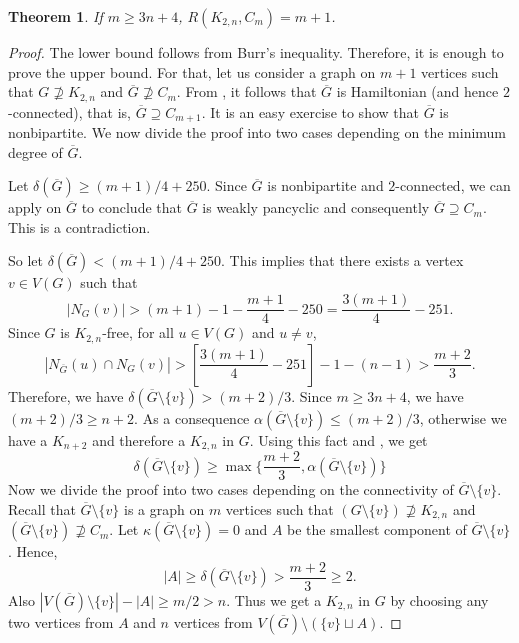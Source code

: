 \documentclass[12pt]{article}
\newtheorem{theorem}{Theorem}
\theoremstyle{definition}
\begin{document}
\begin{theorem}
    If $m\geq 3n+4$, $R(K_{2,n},C_{m})=m+1$.
\end{theorem}
\begin{proof}
    The lower bound follows from Burr's inequality. Therefore, it is enough to prove the upper bound. For that, let us consider a graph on $m+1$ vertices such that $ G\nsupseteq K_{2,n}$ and $ \overline{G}\nsupseteq C_{m}$. From , it follows that $\overline{G}$ is Hamiltonian (and hence $2$-connected), that is, $\overline{G}\supseteq C_{m+1}$. It is an easy exercise to show that $\overline{G}$ is nonbipartite. We now divide the proof into two cases depending on the minimum degree of $\overline{G}$.

    Let $\delta(\overline{G})\geq (m+1)/4+250$. Since $\overline{G}$ is nonbipartite and $2$-connected, we can apply  on $\overline{G}$ to conclude that $\overline{G}$ is weakly pancyclic and consequently $ \overline{G}\supseteq C_{m} $. This is a contradiction.

    So let $\delta(\overline{G})< (m+1)/4+250$. This implies that there exists a vertex $v\in V(G)$ such that
    \begin{equation*}
        |N_G(v)|>(m+1)-1-\frac{m+1}{4}-250=\frac{3(m+1)}{4}-251.
    \end{equation*}
    Since $G$ is $K_{2,n}$-free, for all $u\in V(G)$ and $u\neq v$,
    \begin{equation*}\label{eqn:min degree of G-v}
        |N_{\overline{G}}(u)\cap N_G(v)|>\left[\frac{3(m+1)}{4}-251\right]-1-(n-1)>\frac{m+2}{3}.
    \end{equation*}
    Therefore, we have $\delta(\overline{G}\setminus \{v\})> (m+2)/3$. Since $m\geq 3n+4$, we have $(m+2)/3\geq n+2$. As a consequence $\alpha(\overline{G}\setminus \{v\})\leq (m+2)/3$, otherwise we have a $K_{n+2}$ and therefore a $K_{2,n}$ in $G$. Using this fact and , we get
    \begin{equation*}
        \delta(\overline{G}\setminus \{v\})\geq \max \bigg\{\frac{m+2}{3},\alpha(\overline{G}\setminus \{v\})\bigg\}
    \end{equation*}
    Now we divide the proof into two cases depending on the connectivity of $\overline{G}\setminus \{v\}$. Recall that $\overline{G}\setminus \{v\}$ is a graph on $m$ vertices such that $(G\setminus \{v\})\nsupseteq K_{2,n}$ and $(\overline{G}\setminus \{v\})\nsupseteq C_{m}$. Let $\kappa(\overline{G}\setminus \{v\})=0$ and $A$ be the smallest component of $\overline{G}\setminus \{v\}$. Hence,
    \begin{equation*}
        |A|\geq \delta(\overline{G}\setminus \{v\})>\frac{m+2}{3}\geq 2.
    \end{equation*}
    Also $|V(\overline{G})\setminus\{v\}|- |A|\geq m/2>n$. Thus we get a $K_{2,n}$ in $G$ by choosing any two vertices from $A$ and $n$ vertices from $V(\overline{G})\setminus(\{v\}\sqcup A)$.
    

\end{proof}
\end{document}
